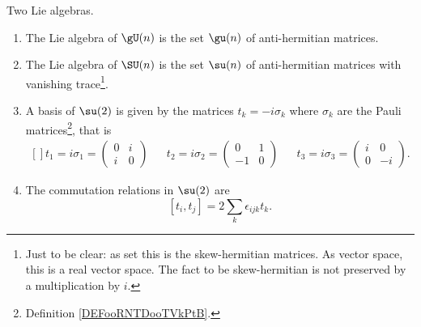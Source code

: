 \begin{proposition}     \label{PROPooHOOLooOrcquD}
	Two Lie algebras.
	\begin{enumerate}
		\item       \label{ITEMooFSTMooGSjovL}
		      The Lie algebra of \( \gU(n)\) is the set \( \gu(n)\) of anti-hermitian matrices.
		\item       \label{ITEMooYEFMooRmGmlF}
		      The Lie algebra of \( \SU(n)\) is the set \( \su(n)\) of anti-hermitian matrices with vanishing trace\footnote{Just to be clear: as set this is the skew-hermitian matrices. As vector space, this is a real vector space. The fact to be skew-hermitian is not preserved by a multiplication by \( i\).}.
		\item           \label{ITEMooXXTRooQZzCfs}
		      A basis of \( \su(2)\) is given by the matrices \( t_k=-i\sigma_k\) where \( \sigma_k\) are the Pauli matrices\footnote{Definition \ref{DEFooRNTDooTVkPtB}.}, that is
		      \begin{equation}
			      \begin{aligned}[]
				      t_1=i\sigma_1=\begin{pmatrix}
					                    0 & i \\
					                    i & 0
				                    \end{pmatrix} &  & t_2=i\sigma_2=\begin{pmatrix}
					                                                     0  & 1 \\
					                                                     -1 & 0
				                                                     \end{pmatrix} &  & t_3=i\sigma_3=\begin{pmatrix}
					                                                                                      i & 0  \\
					                                                                                      0 & -i
				                                                                                      \end{pmatrix}.
			      \end{aligned}
		      \end{equation}
		\item
		      The commutation relations in \( \su(2)\) are
		      \begin{equation}        \label{EQooFJIDooRtQGjA}
			      [t_i,t_j]=2\sum_k\epsilon_{ijk}t_k.
		      \end{equation}
	\end{enumerate}
\end{proposition}

